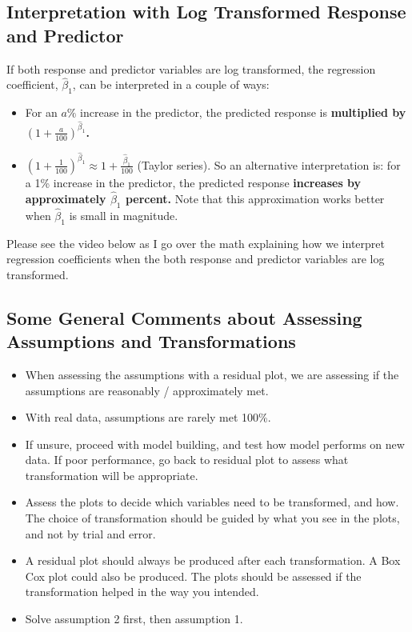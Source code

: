 \documentclass[
]{book}
\begin{document}
\hypertarget{interpretation-with-log-transformed-response-and-predictor}{%
\subsection{Interpretation with Log Transformed Response and Predictor}\label{interpretation-with-log-transformed-response-and-predictor}}

If both response and predictor variables are log transformed, the regression coefficient, \(\hat{\beta}_1\), can be interpreted in a couple of ways:

\begin{itemize}
\item
  For an \(a\%\) increase in the predictor, the predicted response is \textbf{multiplied by \((1 + \frac{a}{100})^{\hat{\beta}_1}\).}
\item
  \((1 + \frac{1}{100})^{\hat{\beta}_1} \approx 1 + \frac{\hat{\beta}_1}{100}\) (Taylor series). So an alternative interpretation is: for a 1\% increase in the predictor, the predicted response \textbf{increases by approximately \(\hat{\beta}_1\) percent.} Note that this approximation works better when \({\hat{\beta}_1}\) is small in magnitude.
\end{itemize}

Please see the video below as I go over the math explaining how we interpret regression coefficients when the both response and predictor variables are log transformed.

\hypertarget{some-general-comments-about-assessing-assumptions-and-transformations}{%
\subsection{Some General Comments about Assessing Assumptions and Transformations}\label{some-general-comments-about-assessing-assumptions-and-transformations}}

\begin{itemize}
\item
  When assessing the assumptions with a residual plot, we are assessing if the assumptions are reasonably / approximately met.
\item
  With real data, assumptions are rarely met 100\%.
\item
  If unsure, proceed with model building, and test how model performs on new data. If poor performance, go back to residual plot to assess what transformation will be appropriate.
\item
  Assess the plots to decide which variables need to be transformed, and how. The choice of transformation should be guided by what you see in the plots, and not by trial and error.
\item
  A residual plot should always be produced after each transformation. A Box Cox plot could also be produced. The plots should be assessed if the transformation helped in the way you intended.
\item
  Solve assumption 2 first, then assumption 1.
\end{itemize}
\end{document}
